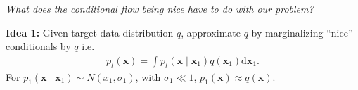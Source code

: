 \documentclass{beamer}
\begin{document}
\begin{frame}
    \begin{center}
        \emph{What does the conditional flow being nice have to do with our problem?}
    \end{center}
\end{frame}
\begin{frame}
    \textbf{Idea 1:} Given target data distribution \( q \), approximate \( q \) by marginalizing ``nice'' conditionals by \( q \) i.e.
    \begin{align*}
        p_t(\mathbf{x}) = \int p_t(\mathbf{x} \mid \mathbf{x}_{1}) q(\mathbf{x}_{1}) \mathrm{d}\mathbf{x}_{1} \tag*{(Marginal Density)}
    .\end{align*}
    For \( p_{1}(\mathbf{x} \mid \mathbf{x}_{1}) \sim N(x_{1}, \sigma_{1}) \), with \( \sigma_{1} \ll 1 \), \( p_{1}(\mathbf{x}) \approx q(\mathbf{x}) \).
    \par
    
\end{frame}
\end{document}
